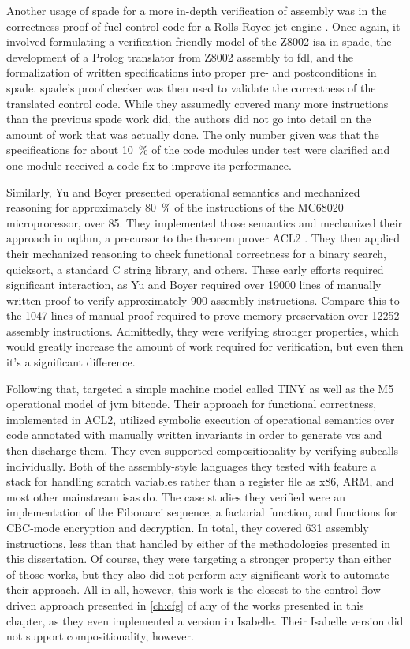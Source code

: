 Another usage of \ac{spade} for a more in-depth verification of assembly
was in the correctness proof of fuel control code for a Rolls-Royce
jet engine \autocite{oneill1988verification}. Once again,
it involved formulating a verification-friendly model of the Z8002 \ac{isa}
in \ac{spade}, the development of a Prolog translator from Z8002 assembly to \ac{fdl},
and the formalization of written specifications into proper pre- and postconditions
in \ac{spade}. \Ac{spade}'s proof checker was then used to validate the correctness
of the translated control code. While they assumedly covered many more instructions
than the previous \ac{spade} work did, the authors did not go into detail
on the amount of work that was actually done.
The only number given was that the specifications for about \SI{10}{\percent}
of the code modules under test were clarified
and one module received a code fix to improve its performance.

Similarly, Yu and Boyer \autocite{yu1993automated,boyer1996automated}
presented operational semantics and mechanized reasoning
for approximately \SI{80}{\percent} of the instructions of the MC68020 microprocessor,
over 85.
They implemented those semantics and mechanized their approach
in \ac{nqthm}, a precursor to the theorem prover ACL2 \autocite{ACL2}.
They then applied their mechanized reasoning to check functional correctness
for a binary search, quicksort, a standard C string library, and others.
These early efforts required significant interaction,
as Yu and Boyer required over \num{19000}
lines of manually written proof to verify approximately \num{900} assembly instructions.
Compare this to the \num{1047} lines of manual proof
required to prove memory preservation over \num{12252} assembly instructions.
Admittedly, they were verifying stronger properties,
which would greatly increase the amount of work required for verification,
but even then it's a significant difference.

Following that, \textcite{matthews2006verification}
targeted a simple machine model called TINY
as well as the M5 operational model of \ac{jvm} bitcode.
Their approach for functional correctness, implemented in ACL2,
utilized symbolic execution of operational semantics
over code annotated with manually written invariants
in order to generate \acp{vc} and then discharge them.
They even supported compositionality by verifying subcalls individually.
Both of the assembly-style languages they tested with feature a stack
for handling scratch variables rather than a register file
as x86, ARM, and most other mainstream \acp{isa} do.
The case studies they verified were an implementation of the Fibonacci sequence,
a factorial function, and functions for CBC-mode encryption and decryption.
In total, they covered \num{631} assembly instructions,
less than that handled by either of the methodologies presented in this dissertation.
Of course, they were targeting a stronger property than either of those works,
but they also did not perform any significant work to automate their approach.
All in all, however, this work is the closest to the control-flow-driven approach
presented in \cref{ch:cfg} of any of the works presented in this chapter,
as they even implemented a version in Isabelle. Their Isabelle version did not support
compositionality, however.

